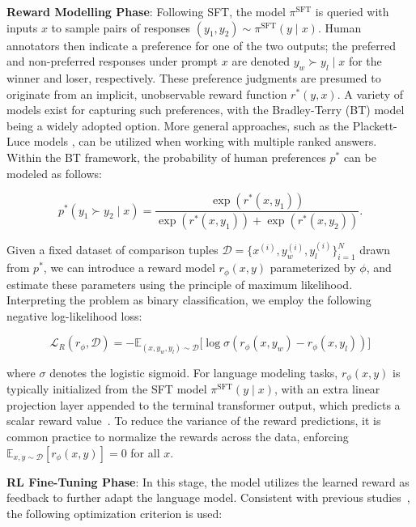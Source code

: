 \textbf{Reward Modelling Phase}: Following SFT, the model $\pi^\text{SFT}$ is queried with inputs $x$ to sample pairs of responses $(y_1, y_2)\sim \pi^\text{SFT}(y \mid x)$. Human annotators then indicate a preference for one of the two outputs; the preferred and non-preferred responses under prompt $x$ are denoted $y_w\succ y_l \mid x$ for the winner and loser, respectively. These preference judgments are presumed to originate from an implicit, unobservable reward function $r^*(y, x)$. A variety of models exist for capturing such preferences, with the Bradley-Terry (BT) model \cite{bradley1952rankanalysis} being a widely adopted option. More general approaches, such as the Plackett-Luce models \citep{plackett1975analysis, luce2012individual}, can be utilized when working with multiple ranked answers. Within the BT framework, the probability of human preferences $p^*$ can be modeled as follows:

\begin{equation}\label{eq:bradley-terry}
    p^*(y_1\succ y_2 \mid x)=\frac{\exp\left(r^*(x, y_1)\right)}{\exp\left(r^*(x, y_1)\right) + \exp\left(r^*(x, y_2)\right)}.
\end{equation}

Given a fixed dataset of comparison tuples $\mathcal{D}=\bigl\{x^{(i)}, y_w^{(i)}, y_l^{(i)}\bigr\}_{i=1}^N$ drawn from $p^*$, we can introduce a reward model $r_{\phi}(x, y)$ parameterized by $\phi$, and estimate these parameters using the principle of maximum likelihood. Interpreting the problem as binary classification, we employ the following negative log-likelihood loss:

\begin{equation}\label{eq:reward_model}
    \mathcal{L}_R(r_{\phi}, \mathcal{D}) = -\mathbb{E}_{(x, y_w, y_l)\sim \mathcal{D}}\bigl[\log \sigma(r_{\phi}(x, y_w)- r_{\phi}(x, y_l))\bigr]
\end{equation}

where $\sigma$ denotes the logistic sigmoid. For language modeling tasks, $r_{\phi}(x, y)$ is typically initialized from the SFT model $\pi^\text{SFT}(y \mid x)$, with an extra linear projection layer appended to the terminal transformer output, which predicts a scalar reward value~\cite{ziegler2020finetuning}. To reduce the variance of the reward predictions, it is common practice to normalize the rewards across the data, enforcing $\mathbb{E}_{x,y\sim \mathcal{D}}\left[r_\phi(x, y)\right] = 0$ for all $x$.

\textbf{RL Fine-Tuning Phase}: In this stage, the model utilizes the learned reward as feedback to further adapt the language model. Consistent with previous studies~\citep{jaques2017sequence, jaques2020human}, the following optimization criterion is used:

